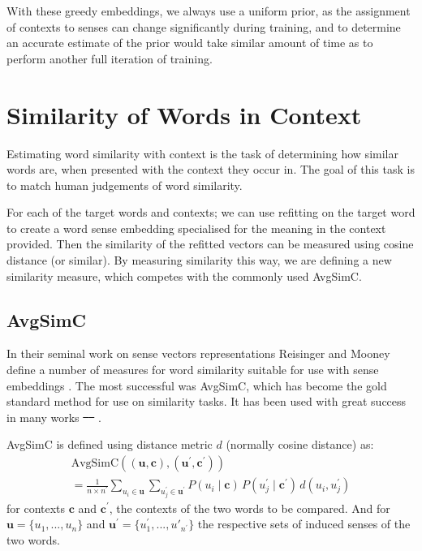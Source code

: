 \documentclass{article} %
\def\parencite{\cite} %
\renewcommand{\c}{\mathbf{c}}
\renewcommand{\u}{\mathbf{u}}
\providecommand{\DIFadd}[1]{{\protect\color{blue}\uwave{#1}}} %
\providecommand{\DIFdel}[1]{{\protect\color{red}\sout{#1}}}                      %
\providecommand{\DIFaddbegin}{} %
\providecommand{\DIFaddend}{} %
\providecommand{\DIFdelbegin}{} %
\providecommand{\DIFdelend}{} %
\begin{document}
With these greedy embeddings, we always use a uniform prior, as the assignment of contexts  to senses can change significantly during training, and to determine an accurate estimate of the prior would take similar amount of time as to perform another full iteration of training.



\section{Similarity of Words in Context} \label{SimilarityInContext}
Estimating word similarity with context is the task of determining how similar words are, when presented with the context they occur in. The goal of this task is to match human judgements of word similarity.

For each of the target words and contexts; we can use refitting on the target word to create a word sense embedding specialised for the meaning in the context provided. Then the similarity of the refitted vectors can be measured using cosine distance (or similar).
By measuring similarity this way, we are defining a new similarity measure, which competes with the commonly used AvgSimC.

\subsection{AvgSimC}
In their seminal work on sense vectors representations Reisinger and Mooney define a number of measures for word similarity suitable for use with sense embeddings \parencite{Reisinger2010}. The most successful was AvgSimC, which has become the gold standard method for use on similarity tasks. It has been used with great success in many works \DIFdelbegin \DIFdel{\mbox{%
\cite{Huang2012, Chen2014, tian2014probabilistic}
}%
}\DIFdelend \DIFaddbegin \DIFadd{\mbox{%
\cite{Huang2012,Chen2014,tian2014probabilistic}
}%
}\DIFaddend . 


AvgSimC is defined using distance metric $d$ (normally cosine distance) as: 
\begin{multline} \label{eq:avgsimc}
\mathrm{AvgSimC}((\u,\c),(\u^{\prime},\c^{\prime})) \\
=  \frac{1}{n \times n^{\prime}}
\sum_{u_{i}\in\u}
\sum_{u_{j}^{\prime}\in\u^{\prime}}
P(u_{i}\mid\c)\,P(u_{j}^{\prime}\mid\c^{\prime})\,d(u_{i},u_{j}^{\prime})
\end{multline}
for contexts $\c$ and $\c^\prime$, the contexts of the two words to be compared.
And for $\u=\{u_1,...,u_n\}$ and $\u^\prime=\{u^\prime_1,...,u\prime_{n^\prime}\}$ the respective sets of induced senses of the two words.
\end{document}
